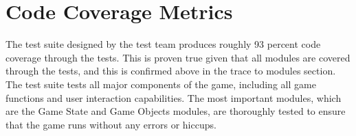 \documentclass[12pt, titlepage]{article}
\begin{document}
\section{Code Coverage Metrics}

The test suite designed by the test team produces roughly 93 percent code coverage through the tests. This is proven true given that all modules are covered through the tests, and this is confirmed above in the trace to modules section. The test suite tests all major components of the game, including all game functions and user interaction capabilities. The most important modules, which are the Game State and Game Objects modules, are thoroughly tested to ensure that the game runs without any errors or hiccups.




\end{document}

